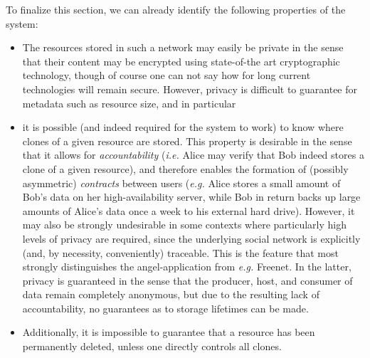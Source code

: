 \documentclass[11pt]{article}
\begin{document}
\begin{mainmatter}
To finalize this section, we can already identify the following properties of the system:
\begin{itemize}
\item The resources stored in such a network may easily be private in the sense that their content may be encrypted using state-of-the art cryptographic technology, though of course one can not say how for long current technologies will remain secure. However, privacy is difficult to guarantee for metadata such as resource size, and in particular
\item it is possible (and indeed required for the system to work) to know where clones of a given resource are stored. This property is desirable in the sense that it allows for \emph{accountability} (\emph{i.e.} Alice may verify that Bob indeed stores a clone of a given resource), and therefore enables the formation of (possibly asymmetric) \emph{contracts} between users (\emph{e.g.} Alice stores a small amount of Bob's data on her high-availability server, while Bob in return backs up large amounts of Alice's data once a week to his external hard drive). However, it may also be strongly undesirable in some contexts where particularly high levels of privacy are required, since the underlying social network is explicitly (and, by necessity, conveniently) traceable. This is the feature that most strongly distinguishes the angel-application from \emph{e.g.} Freenet. In the latter, privacy is guaranteed in the sense that the producer, host, and consumer of data remain completely anonymous, but due to the resulting lack of accountability, no guarantees as to storage lifetimes can be made. 
\item Additionally, it is impossible to guarantee that a resource has been permanently deleted, unless one directly controls all clones.
\end{itemize} 


\end{mainmatter}
\end{document}
